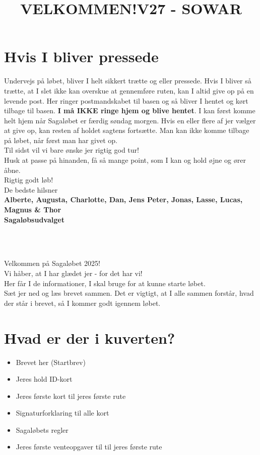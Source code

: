\section{Hvis I bliver pressede}
Undervejs på løbet, bliver I helt sikkert trætte og eller pressede. Hvis I bliver så trætte, at I slet ikke kan overskue at gennemføre ruten, kan I altid give op på en levende post. Her ringer postmandskabet til basen og så bliver I hentet og kørt tilbage til basen. \textbf{I må IKKE ringe hjem og blive hentet}. I kan først komme helt hjem når Sagaløbet er færdig søndag morgen. Hvis en eller flere af jer vælger at give op, kan resten af holdet sagtens fortsætte. Man kan ikke komme tilbage på løbet, når først man har givet op.\\
\newline
Til sidst vil vi bare ønske jer rigtig god tur!\\
Husk at passe på hinanden, få så mange point, som I kan og hold øjne og ører åbne.\\
\newline
Rigtig godt løb!\\
\newline
\textcolor{søblå}{De bedste hilsner}\\
\textcolor{natblå}{\textbf{Alberte, Augusta, Charlotte, Dan, Jens Peter, Jonas, Lasse, Lucas, Magnus \& Thor}}\\
\textcolor{natblå}{\textbf{Sagaløbsudvalget}}\\
\newpage
\title{VELKOMMEN!}\\
\newline
\title{\textcolor{søblå}{V27 - SOWAR }}\\
\newline
Velkommen på Sagaløbet 2025!\\
Vi håber, at I har glædet jer - for det har vi!\\
Her får I de informationer, I skal bruge for at kunne starte løbet.\\
Sæt jer ned og læs brevet sammen. Det er vigtigt, at I alle sammen forstår, hvad der står i brevet, så I kommer godt igennem løbet.
\section{Hvad er der i kuverten?}
\begin{itemize}
    \item Brevet her (Startbrev)
    \item Jeres hold ID-kort
    \item Jeres første kort til jeres første rute
    \item Signaturforklaring til alle kort
    \item Sagaløbets regler
    \item Jeres første venteopgaver til til jeres første rute
\end{itemize}
